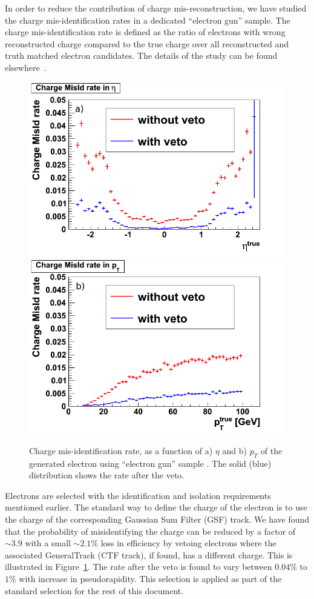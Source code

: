 In order to reduce the contribution of charge mis-reconstruction, we have studied the 
charge mis-identification rates in a dedicated ``electron gun'' sample. The charge 
mis-identification rate is defined as the ratio of electrons with wrong reconstructed
charge compared to the true charge over all reconstructed and truth matched electron
candidates. The details of the study can be found elsewhere~\cite{ctfgsf}.  
\vspace{3 mm}
\begin{figure}[htb]
\begin{center}
\includegraphics[width=0.485\linewidth,height=0.37\linewidth]{figs/ChargeMisIdRateEta.png}
\includegraphics[width=0.485\linewidth,height=0.37\linewidth]{figs/ChargeMisIdRatePt.png}
\caption{Charge mis-identification rate, as a function of a) $\eta$ and b) $p_T$ of the generated
electron using ``electron gun'' sample \label{fig:charge_misid}. The solid (blue) distribution shows
the rate after the veto.}
\end{center}
\end{figure}

Electrons are selected with the identification and isolation requirements
mentioned earlier. 
The standard way to define the charge of the electron is to use the
charge of the corresponding Gaussian Sum Filter (GSF) track.
We have found that the probability of misidentifying the charge can be reduced by 
a factor of $\sim 3.9$ with a small $\sim 2.1\%$ loss in efficiency by vetoing electrons
where the associated GeneralTrack (CTF track), if found, has a different charge.
This is illustrated in Figure~\ref{fig:charge_misid}.
The rate after the veto is found to vary between $0.04\%$ to $1\%$ with increase in 
pseudorapidity. This selection is applied as part of the standard selection for 
the rest of this document.


